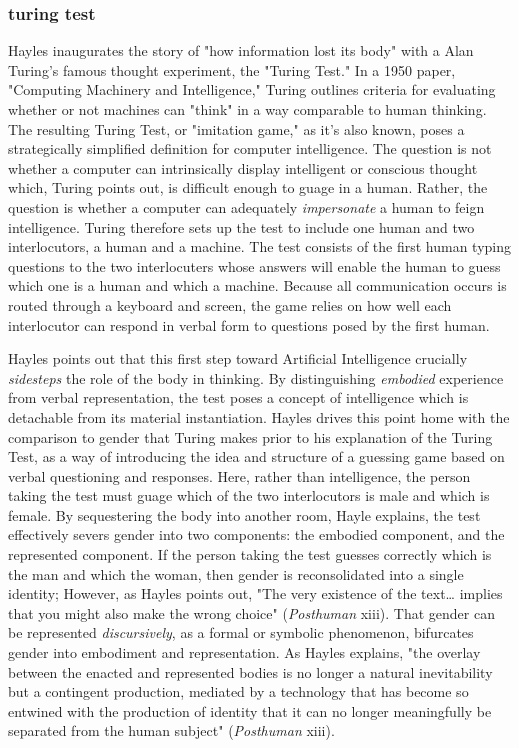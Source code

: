 \documentclass[11pt]{article}
\begin{document}
\subsubsection{turing test}
\label{sec:orgaa4cca9}
Hayles inaugurates the story of "how information lost its body" with a
Alan Turing's famous thought experiment, the "Turing Test." In a 1950
paper, "Computing Machinery and Intelligence," Turing outlines
criteria for evaluating whether or not machines can "think" in a way
comparable to human thinking. The resulting Turing Test, or "imitation
game," as it's also known, poses a strategically simplified definition
for computer intelligence. The question is not whether a computer can
intrinsically display intelligent or conscious thought which, Turing
points out, is difficult enough to guage in a human. Rather, the
question is whether a computer can adequately \emph{impersonate} a human to
feign intelligence. Turing therefore sets up the test to include one
human and two interlocutors, a human and a machine. The test consists
of the first human typing questions to the two interlocuters whose
answers will enable the human to guess which one is a human and which
a machine. Because all communication occurs is routed through a
keyboard and screen, the game relies on how well each interlocutor can
respond in verbal form to questions posed by the first human.

Hayles points out that this first step toward Artificial Intelligence
crucially \emph{sidesteps} the role of the body in thinking. By
distinguishing \emph{embodied} experience from verbal representation, the
test poses a concept of intelligence which is detachable from its
material instantiation. Hayles drives this point home with the
comparison to gender that Turing makes prior to his explanation of the
Turing Test, as a way of introducing the idea and structure of a
guessing game based on verbal questioning and responses. Here, rather
than intelligence, the person taking the test must guage which of the
two interlocutors is male and which is female. By sequestering the
body into another room, Hayle explains, the test effectively severs
gender into two components: the embodied component, and the
represented component. If the person taking the test guesses correctly
which is the man and which the woman, then gender is reconsolidated
into a single identity; However, as Hayles points out, "The very
existence of the text\ldots{}  implies that you might also make the wrong
choice" (\emph{Posthuman} xiii). That gender can be represented
\emph{discursively}, as a formal or symbolic phenomenon, bifurcates gender
into embodiment and representation. As Hayles explains, "the overlay
between the enacted and represented bodies is no longer a natural
inevitability but a contingent production, mediated by a technology
that has become so entwined with the production of identity that it
can no longer meaningfully be separated from the human subject"
(\emph{Posthuman} xiii).
\end{document}
